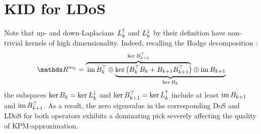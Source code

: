 \chapter{ KID for LDoS }
%
%

Note that up- and down-Laplacians \( L_{k}^{\uparrow} \) and \( L_{k}^{\downarrow} \) by their definition have non-trivial kernels of high dimensionality. Indeed, recalling the Hodge decomposition :
\begin{equation}
      \ds R^{m_k} = \lefteqn{\overbrace{\phantom{\im B_k^\top \oplus  \ker \left( B_k^\top B_k + B_{k+1} B_{k+1}^\top \right)}}^{\ker B_{k+1}^\top}} \im B_k^\top \oplus
      \underbrace{\ker \left( B_k^\top B_k + B_{k+1} B_{k+1}^\top \right) \oplus  \im B_{k+1}}_{\ker B_k}            
\end{equation}
the subspaces \( \ker B_k = \ker L_{k}^{\downarrow} \) and \( \ker B_{k+1}^\top = \ker L_{k}^{\uparrow} \) include at least \( \operatorname{im} B_{k+1}\) and \( \operatorname{im} B_{k+1}^\top \). As a result, the zero eigenvalue in the corresponding DoS and LDoS for both operators exhibits a dominating pick severely affecting the quality of KPM-approximation.